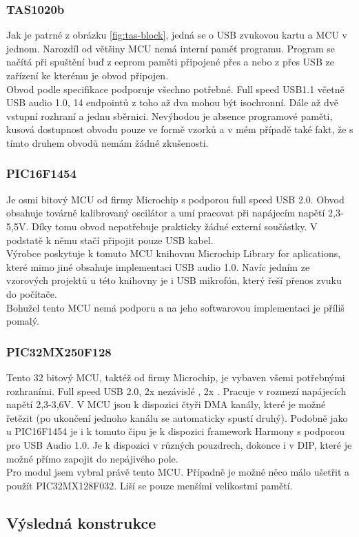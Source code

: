 \subsubsection{TAS1020b}	
Jak je patrné z obrázku \ref{fig:tas-block}, jedná se o USB \iis zvukovou kartu a MCU v jednom. Narozdíl od většiny MCU nemá interní paměť programu. Program se načítá při spuštění buď z eeprom paměti připojené přes \iic a nebo z přes USB ze zařízení ke kterému je obvod připojen.\\
Obvod podle specifikace \cite{tas} podporuje všechno potřebné. Full speed USB1.1 včetně USB audio 1.0, 14 endpointů z toho až dva mohou být isochronní. Dále až dvě vstupní \iis rozhraní a jednu \iic sběrnici. Nevýhodou je absence programové paměti, kusová dostupnost obvodu pouze ve formě vzorků a v mém případě také fakt, že s tímto druhem obvodů nemám žádné zkušenosti.

\subsubsection{PIC16F1454}
Je osmi bitový MCU od firmy Microchip s podporou full speed USB 2.0. Obvod obsahuje továrně kalibrovaný oscilátor a umí pracovat při napájecím napětí 2,3-5,5V. Díky tomu obvod nepotřebuje prakticky žádné externí součástky. V podstatě k němu stačí připojit pouze USB kabel.\\
Výrobce poskytuje k tomuto MCU knihovnu Microchip Library for aplications, které mimo jiné obsahuje implementaci USB audio 1.0. Navíc jedním ze vzorových projektů u této knihovny je i USB mikrofón, který řeší přenos zvuku do počítače.\\
Bohužel tento MCU nemá podporu \iis a na jeho softwarovou implementaci je příliš pomalý. 

\subsubsection{PIC32MX250F128}
Tento 32 bitový MCU, taktéž od firmy Microchip, je vybaven všemi potřebnými rozhraními. Full speed USB 2.0, 2x nezávislé \iis, 2x \iic. Pracuje v rozmezí napájecích napětí 2,3-3,6V. V MCU jsou k dispozici čtyři DMA kanály, které je možné řetězit (po ukončení jednoho kanálu se automaticky spustí druhý). Podobně jako u PIC16F1454 je i k tomuto čipu je k dispozici framework Harmony \cite{harmony} s podporou pro USB Audio 1.0. Je k dispozici v různých pouzdrech, dokonce i v DIP, které je možné přímo zapojit do nepájivého pole.\\
Pro modul jsem vybral právě tento MCU. Případně je možné něco málo ušetřit a použít PIC32MX128F032. Liší se pouze menšími velikostmi pamětí.

\subsection{Výsledná konstrukce}

